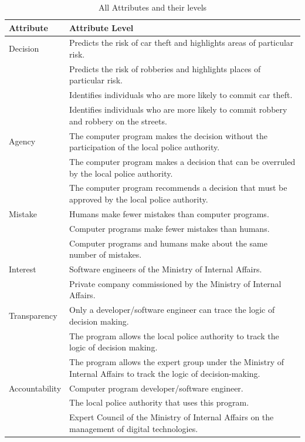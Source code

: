 \begin{table}[h]
    \centering
    \footnotesize
    \renewcommand{\arraystretch}{1.2}  %
    \begin{tabularx}{\textwidth}{lX}  %
        \toprule
        \textbf{Attribute} & \textbf{Attribute Level} \\
        \midrule
        Decision  & Predicts the risk of car theft and highlights areas of particular risk. \\
                  & Predicts the risk of robberies and highlights places of particular risk. \\
                  & Identifies individuals who are more likely to commit car theft. \\
                  & Identifies individuals who are more likely to commit robbery and robbery on the streets. \\
        \midrule
        Agency & The computer program makes the decision without the participation of the local police authority. \\
               & The computer program makes a decision that can be overruled by the local police authority. \\
               & The computer program recommends a decision that must be approved by the local police authority. \\
        \midrule
        Mistake & Humans make fewer mistakes than computer programs. \\
                & Computer programs make fewer mistakes than humans. \\
                & Computer programs and humans make about the same number of mistakes. \\
        \midrule
        Interest  & Software engineers of the Ministry of Internal Affairs. \\
                  & Private company commissioned by the Ministry of Internal Affairs. \\
        \midrule 
        Transparency & Only a developer/software engineer can trace the logic of decision making. \\
                     & The program allows the local police authority to track the logic of decision making. \\
                     & The program allows the expert group under the Ministry of Internal Affairs to track the logic of decision-making. \\
        \midrule
        Accountability  & Computer program developer/software engineer. \\
                        & The local police authority that uses this program. \\
                        & Expert Council of the Ministry of Internal Affairs on the management of digital technologies. \\
        \bottomrule
    \end{tabularx}
    \caption{All Attributes and their levels}
    \label{tab:attributes2}
\end{table}